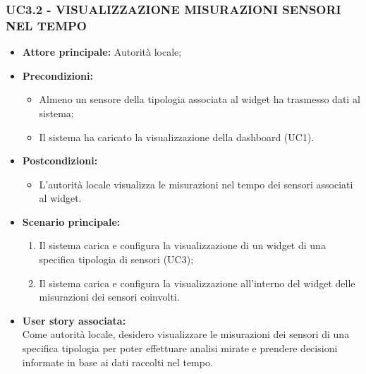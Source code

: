 \subsubsection{UC3.2 - VISUALIZZAZIONE MISURAZIONI SENSORI NEL TEMPO}
\begin{itemize}
    \item \textbf{Attore principale:} Autorità locale;
    \item \textbf{Precondizioni:}
        \begin{itemize}
            \item Almeno un sensore della tipologia associata al widget ha trasmesso dati al sistema;
            \item Il sistema ha caricato la visualizzazione della dashboard (UC1).
        \end{itemize}
    \item \textbf{Postcondizioni:}
        \begin{itemize}
            \item  L'autorità locale visualizza le misurazioni nel tempo dei sensori associati al widget.
        \end{itemize}
    \item \textbf{Scenario principale:}
        \begin{enumerate}
            \item Il sistema carica e configura la visualizzazione di un widget di una specifica tipologia di sensori (UC3);
            \item Il sistema carica e configura la visualizzazione all'interno del widget delle misurazioni dei sensori coinvolti.
        \end{enumerate}
    \item \textbf{User story associata:} \\
        Come autorità locale, desidero visualizzare le misurazioni dei sensori di una specifica tipologia per poter effettuare analisi mirate e prendere decisioni informate in base ai dati raccolti nel tempo.
\end{itemize}
